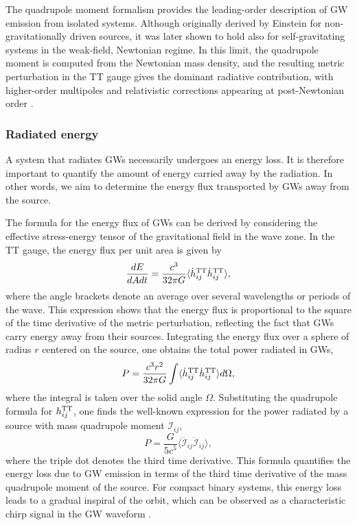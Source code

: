 The quadrupole moment formalism provides the leading-order description 
of GW emission from isolated systems. Although originally derived by 
Einstein for non-gravitationally driven sources, it was later shown to 
hold also for self-gravitating systems in the weak-field, Newtonian 
regime. In this limit, the quadrupole moment is computed from the 
Newtonian mass density, and the resulting metric perturbation in the 
TT gauge gives the dominant radiative contribution, with higher-order 
multipoles and relativistic corrections appearing at post-Newtonian order 
\cite{blanchet2024postnewtoniantheorygravitationalwaves}.

\subsubsection{Radiated energy}

A system that radiates GWs necessarily undergoes an energy loss. It is therefore important to quantify the amount of energy carried away by the radiation. In other words, we aim to determine the energy flux transported by GWs away from the source.

The formula for the energy flux of GWs can be derived by considering the effective stress-energy tensor of the gravitational field in the wave zone. In the TT gauge, the energy flux per unit area is given by
\begin{equation}
\frac{dE}{dA dt} = \frac{c^3}{32\pi G} \langle \dot{h}_{ij}^{\rm TT} \dot{h}_{ij}^{\rm TT} \rangle,
\end{equation}
where the angle brackets denote an average over several wavelengths or periods of the wave. This expression shows that the energy flux is proportional to the square of the time derivative of the metric perturbation, reflecting the fact that GWs carry energy away from their sources.
Integrating the energy flux over a sphere of radius $r$ centered on the source, one obtains the total power radiated in GWs,
\begin{equation}
P = \frac{c^3 r^2}{32\pi G} \int \langle \dot{h}_{ij}^{\rm TT} \dot{h}_{ij}^{\rm TT} \rangle d\Omega,
\end{equation}where the integral is taken over the solid angle $\Omega$. Substituting the quadrupole formula for $h_{ij}^{\rm TT}$, one finds the well-known expression for the power radiated by a source with mass quadrupole moment $\mathcal{I}_{ij}$,
\begin{equation}
P = \frac{G}{5c^5} \langle \dddot{\mathcal{I}}_{ij} \dddot{\mathcal{I}}_{ij} \rangle,
\end{equation}
where the triple dot denotes the third time derivative. This formula quantifies the energy loss due to GW emission in terms of the third time derivative of the mass quadrupole moment of the source. For compact binary systems, this energy loss leads to a gradual inspiral of the orbit, which can be observed as a characteristic chirp signal in the GW waveform \cite{maggiore2007gravitational}.



